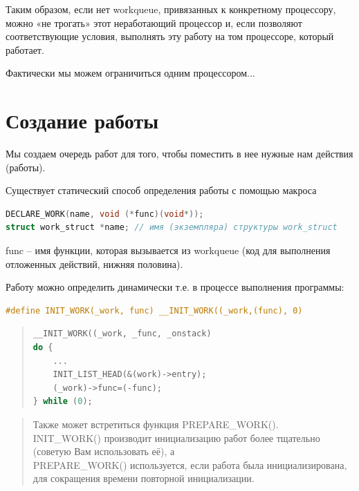 Таким образом, если нет workqueue, привязанных к конкретному процессору, можно «не трогать» этот неработающий процессор и, если позволяют соответствующие условия, выполнять эту работу на том процессоре, который работает.

Фактически мы можем ограничиться одним процессором...

\section{Создание работы}
\par Мы создаем очередь работ для того, чтобы поместить в нее нужные нам действия (работы). 

\par Существует статический способ определения работы с помощью макроса

\begin{lstlisting}[language=C, label=lst:1, caption=Статический способ определения]
DECLARE_WORK(name, void (*func)(void*));
struct work_struct *name; // имя (экземпляра) структуры work_struct
\end{lstlisting}

func -- имя функции, которая вызывается из workqueue (код для выполнения отложенных действий, нижняя половина).

\par Работу можно определить динамически т.е. в процессе выполнения программы:

\begin{lstlisting}[language=C, label=lst:1, caption=Динамический способ определения]
#define INIT_WORK(_work, func) __INIT_WORK((_work,(func), 0)
\end{lstlisting}

\begin{quote}
\begin{lstlisting}[language=C, label=lst:1, caption=Определение \_\_INIT\_WORK()]
__INIT_WORK((_work, _func, _onstack)
do {
    ...
    INIT_LIST_HEAD(&(work)->entry);
    (_work)->func=(-func);
} while (0);
\end{lstlisting}
\end{quote}

\begin{quote}
Также может встретиться функция PREPARE\_WORK(). \\ INIT\_WORK() производит инициализацию работ более тщательно (советую Вам использовать её), а \\ PREPARE\_WORK() используется, если работа была инициализирована, для сокращения времени повторной инициализации.
\end{quote}

